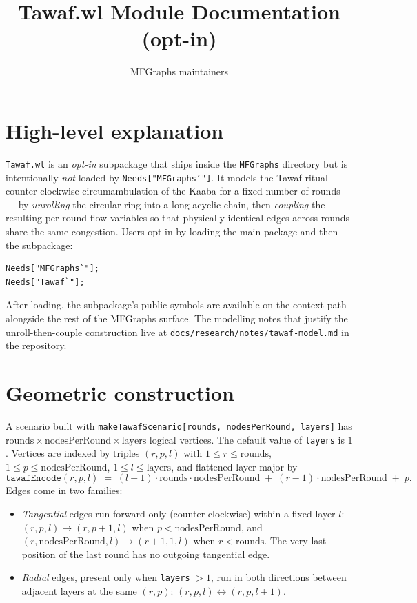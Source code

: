 \documentclass[11pt]{article}
\title{Tawaf.wl Module Documentation (opt-in)}
\author{MFGraphs maintainers}
\date{}
\begin{document}
\maketitle

\section{High-level explanation}

\texttt{Tawaf.wl} is an \emph{opt-in} subpackage that ships inside the \texttt{MFGraphs} directory but is intentionally \emph{not} loaded by \texttt{Needs["MFGraphs`"]}. It models the Tawaf ritual --- counter-clockwise circumambulation of the Kaaba for a fixed number of rounds --- by \emph{unrolling} the circular ring into a long acyclic chain, then \emph{coupling} the resulting per-round flow variables so that physically identical edges across rounds share the same congestion. Users opt in by loading the main package and then the subpackage:

\begin{verbatim}
Needs["MFGraphs`"];
Needs["Tawaf`"];
\end{verbatim}

After loading, the subpackage's public symbols are available on the context path alongside the rest of the MFGraphs surface. The modelling notes that justify the unroll-then-couple construction live at \texttt{docs/research/notes/tawaf-model.md} in the repository.

\section{Geometric construction}

A scenario built with \texttt{makeTawafScenario[rounds, nodesPerRound, layers]} has $\text{rounds} \times \text{nodesPerRound} \times \text{layers}$ logical vertices. The default value of \texttt{layers} is $1$. Vertices are indexed by triples $(r, p, l)$ with $1 \le r \le \text{rounds}$, $1 \le p \le \text{nodesPerRound}$, $1 \le l \le \text{layers}$, and flattened layer-major by
\[
\texttt{tawafEncode}(r, p, l) \;=\; (l - 1)\cdot \text{rounds} \cdot \text{nodesPerRound} \;+\; (r - 1)\cdot \text{nodesPerRound} \;+\; p.
\]
Edges come in two families:
\begin{itemize}
\item \emph{Tangential} edges run forward only (counter-clockwise) within a fixed layer $l$: $(r, p, l) \to (r, p+1, l)$ when $p < \text{nodesPerRound}$, and $(r, \text{nodesPerRound}, l) \to (r+1, 1, l)$ when $r < \text{rounds}$. The very last position of the last round has no outgoing tangential edge.
\item \emph{Radial} edges, present only when \texttt{layers} $> 1$, run in both directions between adjacent layers at the same $(r, p)$: $(r, p, l) \leftrightarrow (r, p, l+1)$.
\end{itemize}
\end{document}
